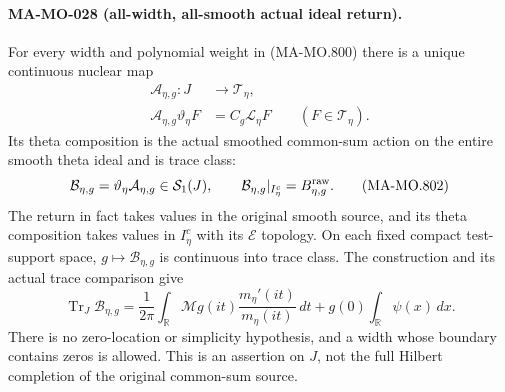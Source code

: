 \paragraph{MA-MO-028 (all-width, all-smooth actual ideal return).}
For every width and polynomial weight in (MA-MO.800)
there is a unique continuous nuclear map
\[
 \begin{aligned}
 \mathcal A_{\eta,g}:J&\longrightarrow\mathcal T_\eta,\\
 \mathcal A_{\eta,g}\vartheta_\eta F
       &=C_g\mathcal L_\eta F
                         \qquad(F\in\mathcal T_\eta).
 \end{aligned}
 \tag{MA-MO.801}
\]
Its theta composition is the actual smoothed common-sum
action on the entire smooth theta ideal and is trace class:
\[
 \mathcal B_{\eta,g}=\vartheta_\eta\mathcal A_{\eta,g}
       \in\mathcal S_1(J),\qquad
 \mathcal B_{\eta,g}|_{I_\eta^c}
                    =B^{\rm raw}_{\eta,g}.
 \tag{MA-MO.802}
\]
The return in fact takes values in the original smooth
source, and its theta composition takes values in
\(I_\eta^c\) with its \(\mathcal E\) topology.
On each fixed compact test-support space,
\(g\mapsto\mathcal B_{\eta,g}\) is continuous into trace
class. The construction and its actual trace comparison
give
\[
 \operatorname{Tr}_{J}\mathcal B_{\eta,g}
 =\frac1{2\pi}\int_{\mathbb R}
      \mathcal Mg(it)\frac{m_\eta'(it)}{m_\eta(it)}\,dt
                  +g(0)\int_{\mathbb R}\psi(x)\,dx .
 \tag{MA-MO.803}
\]
There is no zero-location or simplicity hypothesis,
and a width whose boundary contains zeros is allowed.
This is an assertion on \(J\), not the full Hilbert
completion of the original common-sum source.

